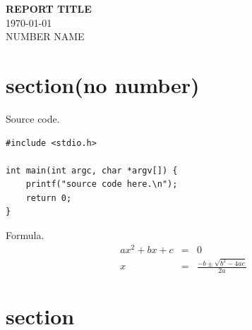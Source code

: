 \documentclass[10pt]{jsarticle}
\begin{document}
\begin{titlepage}
\begin{center}\begin{LARGE}
\vspace*{30mm}
\textbf{\Huge REPORT TITLE}\\
\vspace{10mm}
\today\\
\vspace{130mm}
NUMBER NAME\\
\end{LARGE}\end{center}
\end{titlepage}

\section*{section(no number)}
Source code.
\vspace{5mm}
\begin{lstlisting}[basicstyle=\ttfamily\footnotesize, frame=single]
#include <stdio.h>

int main(int argc, char *argv[]) {
    printf("source code here.\n");
    return 0;
}
\end{lstlisting}
\vspace{5mm}
Formula. 
\begin{eqnarray*}
  ax^2 + bx + c &=& 0\\
  x &=& \frac{-b \pm \sqrt{b^2 - 4ac}}{2a}
\end{eqnarray*}

\section{section}
\end{document}
